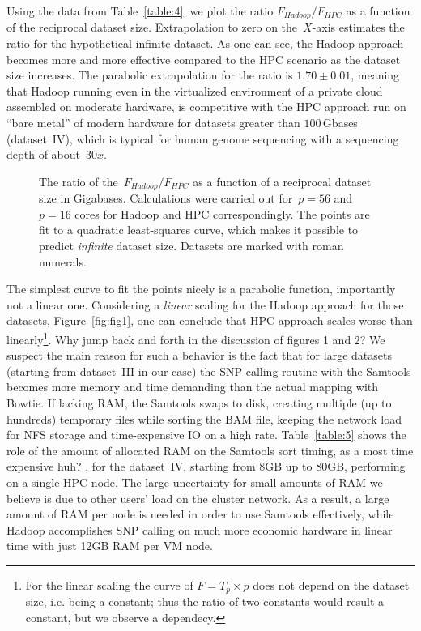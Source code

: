 \documentclass[11pt, oneside]{article}   	%
\newcommand{\COMMENT}[1]{{\color{red} #1 }}
\begin{document}
Using the data from Table~\ref{table:4}, we plot the ratio $F_{Hadoop}/F_{HPC}$ as a function of the reciprocal dataset size. Extrapolation to zero on the~$X$-axis estimates the ratio for the hypothetical infinite dataset. As one can see, the Hadoop approach becomes more and more effective compared to the HPC scenario as the dataset size increases. 
The parabolic extrapolation for the ratio is $1.70\pm0.01$, meaning that Hadoop running even in the virtualized environment of a private cloud assembled on moderate hardware, is competitive with the HPC approach run on ``bare metal'' of modern hardware for datasets greater than $100$\,Gbases (dataset~IV), which is typical for human genome sequencing with a sequencing depth of about~$30x$.

\begin{figure}
	
	\caption{The ratio of the~$F_{Hadoop}/F_{HPC}$ as a function of a reciprocal dataset size in Gigabases. Calculations were carried out for~$p=56$ and $p=16$ cores for Hadoop and HPC correspondingly.
The points are fit to a quadratic least-squares curve, which makes it possible to predict {\it infinite} dataset size. Datasets are marked with roman numerals.}
	\label{fig:fig2}
\end{figure}


The simplest curve to fit the points nicely is a parabolic function, importantly not a linear one. Considering a {\it linear} scaling for the Hadoop approach for those datasets, Figure~\ref{fig:fig1}, one can conclude that HPC approach scales worse than linearly\footnote{For the linear scaling the curve of $F=T_{p}\times p$ does not depend on the dataset size, i.e. being a constant; thus the ratio of two constants would result a constant, but we observe a dependecy.}. \COMMENT{Why jump back and forth in the discussion of figures 1 and 2?} We suspect the main reason for such a behavior is the fact that for large datasets (starting from dataset~III in our case) the SNP calling routine with the Samtools becomes more memory and time demanding than the actual mapping with Bowtie.
If lacking  RAM, the Samtools swaps to disk, creating multiple (up to hundreds) temporary files while sorting the BAM file, keeping the network load for NFS storage and time-expensive IO on a high rate.
Table~\ref{table:5} shows the role of the amount of allocated RAM on the Samtools sort timing, as a most time expensive \COMMENT{huh?}, for the dataset~IV, starting from 8GB up to 80GB, performing on a single HPC node. The large uncertainty for small amounts of RAM we believe is due to other users' load on the cluster network. As a result, a large amount of RAM per node is needed in order to use Samtools effectively, while Hadoop accomplishes SNP calling on much more economic hardware in linear time with just 12GB RAM per VM node.
\end{document}
